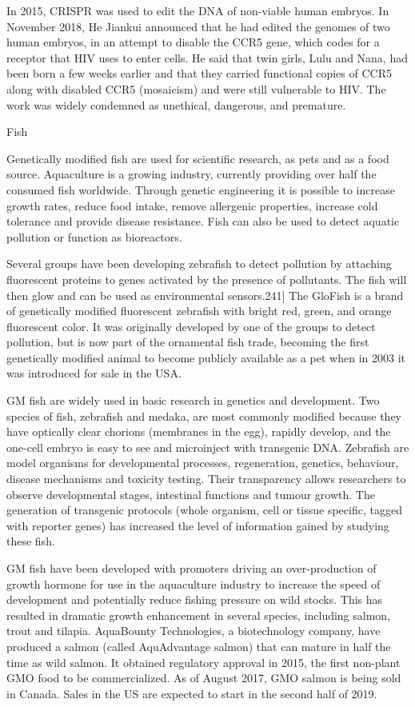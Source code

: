 In 2015, CRISPR was used to edit the DNA of non-viable human embryos. In November 2018, He Jiankui announced that he had edited the genomes of two human embryos, in an attempt to disable the CCR5 gene, which codes for a receptor that HIV uses to enter cells. He said that twin girls, Lulu and Nana, had been born a few weeks earlier and that they carried functional copies of CCR5 along with disabled CCR5 (mosaicism) and were still vulnerable to HIV. The work was widely condemned as unethical, dangerous, and premature.

Fish

Genetically modified fish are used for scientific research, as pets and as a food source. Aquaculture is a growing industry, currently providing over half the consumed fish worldwide. Through genetic engineering it is possible to increase growth rates, reduce food intake, remove allergenic properties, increase cold tolerance and provide disease resistance. Fish can also be used to detect aquatic pollution or function as bioreactors.

Several groups have been developing zebrafish to detect pollution by attaching fluorescent proteins to genes activated by the presence of pollutants. The fish will then glow and can be used as environmental sensors.241{]} The GloFish is a brand of genetically modified fluorescent zebrafish with bright red, green, and orange fluorescent color. It was originally developed by one of the groups to detect pollution, but is now part of the ornamental fish trade, becoming the first genetically modified animal to become publicly available as a pet when in 2003 it was introduced for sale in the USA.

GM fish are widely used in basic research in genetics and development. Two species of fish, zebrafish and medaka, are most commonly modified because they have optically clear chorions (membranes in the egg), rapidly develop, and the one-cell embryo is easy to see and microinject with transgenic DNA. Zebrafish are model organisms for developmental processes, regeneration, genetics, behaviour, disease mechanisms and toxicity testing. Their transparency allows researchers to observe developmental stages, intestinal functions and tumour growth. The generation of transgenic protocols (whole organism, cell or tissue specific, tagged with reporter genes) has increased the level of information gained by studying these fish.

GM fish have been developed with promoters driving an over-production of growth hormone for use in the aquaculture industry to increase the speed of development and potentially reduce fishing pressure on wild stocks. This has resulted in dramatic growth enhancement in several species, including salmon, trout and tilapia. AquaBounty Technologies, a biotechnology company, have produced a salmon (called AquAdvantage salmon) that can mature in half the time as wild salmon. It obtained regulatory approval in 2015, the first non-plant GMO food to be commercialized. As of August 2017, GMO salmon is being sold in Canada. Sales in the US are expected to start in the second half of 2019.

